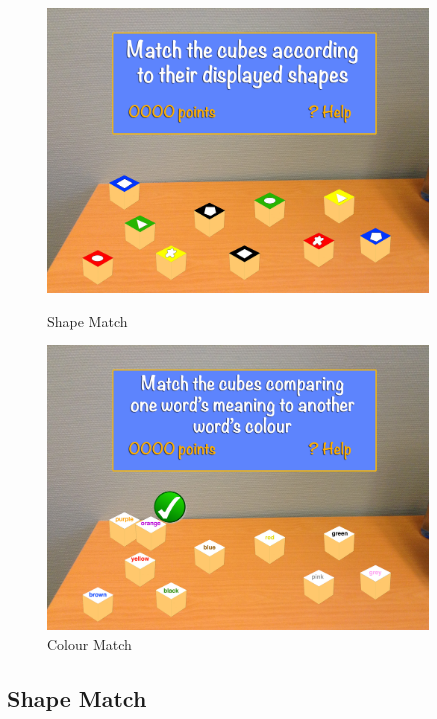 \begin{figure}[h]
	\centering
	\begin{minipage}{.5\textwidth}
		\capstart
		\centering
		\includegraphics[width=0.9\textwidth]{images/Costas/game_mockup1(matching).jpg}
		\vspace{-10pt}
		\caption{Shape Match}
		\label{fig:Costas_shape_match}
	\end{minipage}%
	\begin{minipage}{.5\textwidth}
		\capstart
		\centering
		\includegraphics[width=0.9\textwidth]{images/Costas/game_mockup1(matching2).jpg}
		\vspace{-10pt}
		\caption{Colour Match}
		\label{fig:Costas_colour_match}
	\end{minipage}%
\end{figure}

\subsection{Shape Match}
	\label{game:shape_match} 

